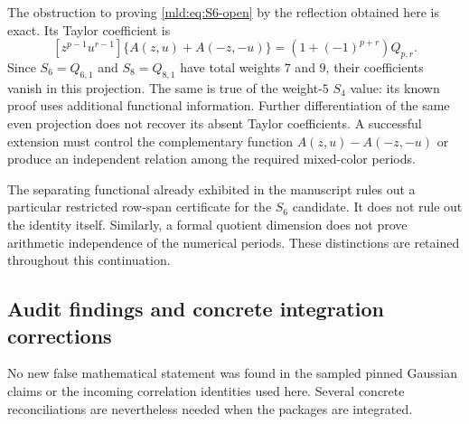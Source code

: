 The obstruction to proving \eqref{mld:eq:S6-open} by the reflection obtained
here is exact. Its Taylor coefficient is
\[
 [z^{p-1}u^{r-1}]\{A(z,u)+A(-z,-u)\}
           =(1+(-1)^{p+r})Q_{p,r}.
\]
Since $S_6=Q_{6,1}$ and $S_8=Q_{8,1}$ have total weights $7$ and $9$,
their coefficients vanish in this projection. The same is true of the
weight-$5$ $S_4$ value: its known proof uses additional functional
information. Further differentiation of the same even projection
does not recover its absent Taylor coefficients. A successful extension
must control the complementary function
$A(z,u)-A(-z,-u)$ or produce an independent relation among the required
mixed-color periods.

The separating functional already exhibited in the manuscript rules out
a particular restricted row-span certificate for the $S_6$ candidate.
It does not rule out the identity itself. Similarly, a formal quotient
dimension does not prove arithmetic independence of the numerical
periods. These distinctions are retained throughout this continuation.

\subsection{Audit findings and concrete integration corrections}

No new false mathematical statement was found in the sampled pinned
Gaussian claims or the incoming correlation identities used here.
Several concrete reconciliations are nevertheless needed when the
packages are integrated.

